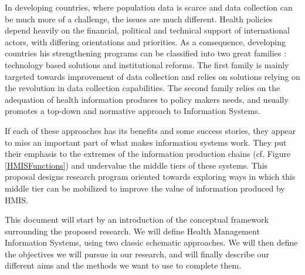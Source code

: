 In developing countries, where population data is scarce and data collection can be much more of a challenge, the issues are much different. Health policies depend heavily on the financial, political and technical support of international actors, with differing orientations and priorities. As a consequence, developing countries \gls*{his} strengthening programs can be classified into two great families : technology based solutions and institutional reforms. The first family is mainly targeted towards improvement of data collection and relies on solutions relying on the revolution in  data collection capabilities. The second family relies on the adequation of health information produces to policy makers needs, and usually promotes a top-down and normative approach to Information Systems.


If each of these approaches has its benefits and some success stories,  they appear to miss an important part of what makes information systems work. They put their emphasis to the extremes of the information production chains (cf. Figure \ref{HMISFunctions}) and undervalue the middle tiers of these systems. This proposal designs research program oriented towards exploring ways in which this middle tier can be mobilized to improve the value of information produced by HMIS.

This document will start by an introduction of the conceptual framework surrounding the proposed research. We will define Health Management Information Systems, using two classic schematic approaches. We will then define the objectives we will pursue in our research, and will finally describe our different aims and the methods we want to use to complete them.




